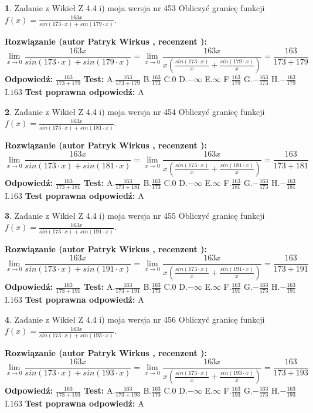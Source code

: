 \documentclass[12pt, a4paper]{article}
\theoremstyle{definition} %
\newtheorem{zad}{}
\newcommand{\zadStart}[1]{\begin{zad}#1\newline}
\newcommand{\zadStop}{\end{zad}}
\newcommand{\rozwStart}[2]{\noindent \textbf{Rozwiązanie (autor #1 , recenzent #2): }\newline}
\newcommand{\rozwStop}{\newline}
\newcommand{\odpStart}{\noindent \textbf{Odpowiedź:}\newline}
\newcommand{\odpStop}{\newline}
\newcommand{\testStart}{\noindent \textbf{Test:}\newline}
\newcommand{\testStop}{\newline}
\newcommand{\kluczStart}{\noindent \textbf{Test poprawna odpowiedź:}\newline}
\newcommand{\kluczStop}{\newline}
\begin{document}
\zadStart{Zadanie z Wikieł Z 4.4 i) moja wersja nr 453}
Obliczyć granicę funkcji $f(x)=\frac{163x}{sin(173\cdot x) +sin(179\cdot x)}$.
\zadStop
\rozwStart{Patryk Wirkus}{}
$$\lim\limits_{x\to 0}\frac{163x}{sin(173\cdot x) +sin(179\cdot x)}=\lim\limits_{x\to 0}\frac{163x}{x(\frac{sin(173\cdot x)}{x}+\frac{sin(179\cdot x)}{x})}=\frac{163}{173+179}$$
\rozwStop
\odpStart
$\frac{163}{173+179}$
\odpStop
\testStart
A.$\frac{163}{173+179}$
B.$\frac{163}{173}$
C.$0$
D.$-\infty$
E.$\infty$
F.$\frac{163}{179}$
G.$-\frac{163}{173}$
H.$-\frac{163}{179}$
I.$163$
\testStop
\kluczStart
A
\kluczStop



\zadStart{Zadanie z Wikieł Z 4.4 i) moja wersja nr 454}
Obliczyć granicę funkcji $f(x)=\frac{163x}{sin(173\cdot x) +sin(181\cdot x)}$.
\zadStop
\rozwStart{Patryk Wirkus}{}
$$\lim\limits_{x\to 0}\frac{163x}{sin(173\cdot x) +sin(181\cdot x)}=\lim\limits_{x\to 0}\frac{163x}{x(\frac{sin(173\cdot x)}{x}+\frac{sin(181\cdot x)}{x})}=\frac{163}{173+181}$$
\rozwStop
\odpStart
$\frac{163}{173+181}$
\odpStop
\testStart
A.$\frac{163}{173+181}$
B.$\frac{163}{173}$
C.$0$
D.$-\infty$
E.$\infty$
F.$\frac{163}{181}$
G.$-\frac{163}{173}$
H.$-\frac{163}{181}$
I.$163$
\testStop
\kluczStart
A
\kluczStop



\zadStart{Zadanie z Wikieł Z 4.4 i) moja wersja nr 455}
Obliczyć granicę funkcji $f(x)=\frac{163x}{sin(173\cdot x) +sin(191\cdot x)}$.
\zadStop
\rozwStart{Patryk Wirkus}{}
$$\lim\limits_{x\to 0}\frac{163x}{sin(173\cdot x) +sin(191\cdot x)}=\lim\limits_{x\to 0}\frac{163x}{x(\frac{sin(173\cdot x)}{x}+\frac{sin(191\cdot x)}{x})}=\frac{163}{173+191}$$
\rozwStop
\odpStart
$\frac{163}{173+191}$
\odpStop
\testStart
A.$\frac{163}{173+191}$
B.$\frac{163}{173}$
C.$0$
D.$-\infty$
E.$\infty$
F.$\frac{163}{191}$
G.$-\frac{163}{173}$
H.$-\frac{163}{191}$
I.$163$
\testStop
\kluczStart
A
\kluczStop



\zadStart{Zadanie z Wikieł Z 4.4 i) moja wersja nr 456}
Obliczyć granicę funkcji $f(x)=\frac{163x}{sin(173\cdot x) +sin(193\cdot x)}$.
\zadStop
\rozwStart{Patryk Wirkus}{}
$$\lim\limits_{x\to 0}\frac{163x}{sin(173\cdot x) +sin(193\cdot x)}=\lim\limits_{x\to 0}\frac{163x}{x(\frac{sin(173\cdot x)}{x}+\frac{sin(193\cdot x)}{x})}=\frac{163}{173+193}$$
\rozwStop
\odpStart
$\frac{163}{173+193}$
\odpStop
\testStart
A.$\frac{163}{173+193}$
B.$\frac{163}{173}$
C.$0$
D.$-\infty$
E.$\infty$
F.$\frac{163}{193}$
G.$-\frac{163}{173}$
H.$-\frac{163}{193}$
I.$163$
\testStop
\kluczStart
A
\kluczStop
\end{document}
